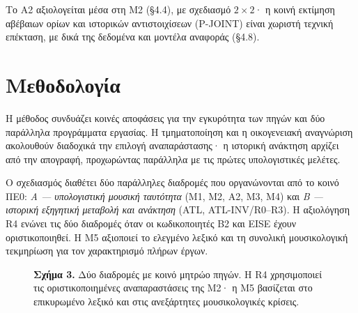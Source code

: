\documentclass[11pt,a4paper]{article}
\newcommand{\figcap}[2]{\par\vspace{3pt}\begin{minipage}{0.95\linewidth}\footnotesize\textbf{#1} #2\end{minipage}\par}
\begin{document}
\noindent Το Α2 αξιολογείται μέσα στη Μ2 (§4.4), με σχεδιασμό $2\times2$· η κοινή εκτίμηση αβέβαιων ορίων και ιστορικών αντιστοιχίσεων (P-JOINT) είναι χωριστή τεχνική επέκταση, με δικά της δεδομένα και μοντέλα αναφοράς (§4.8).


\section{Μεθοδολογία}\label{ux3bcux3b5ux3b8ux3bfux3b4ux3bfux3bbux3bfux3b3ux3afux3b1}

Η μέθοδος συνδυάζει κοινές αποφάσεις για την εγκυρότητα των πηγών και δύο παράλληλα προγράμματα εργασίας. Η τμηματοποίηση και η οικογενειακή αναγνώριση ακολουθούν διαδοχικά την επιλογή αναπαράστασης· η ιστορική ανάκτηση αρχίζει από την απογραφή, προχωρώντας παράλληλα με τις πρώτες υπολογιστικές μελέτες.

Ο σχεδιασμός διαθέτει δύο παράλληλες διαδρομές που οργανώνονται από το κοινό ΠΕ0: \emph{Α — υπολογιστική μουσική ταυτότητα} (Μ1, Μ2, Α2, Μ3, Μ4) και \emph{Β — ιστορική εξηγητική μεταβολή και ανάκτηση} (ATL, ATL-INV/R0--R3). Η αξιολόγηση R4 ενώνει τις δύο διαδρομές όταν οι κωδικοποιητές B2 και EISE έχουν οριστικοποιηθεί. Η Μ5 αξιοποιεί το ελεγμένο λεξικό και τη συνολική μουσικολογική τεκμηρίωση για τον χαρακτηρισμό πλήρων έργων.


\begin{figure}[htbp]
\centering
{}
\figcap{Σχήμα 3.}{Δύο διαδρομές με κοινό μητρώο πηγών. Η R4 χρησιμοποιεί τις οριστικοποιημένες αναπαραστάσεις της M2· η M5 βασίζεται στο επικυρωμένο λεξικό και στις ανεξάρτητες μουσικολογικές κρίσεις.}
\end{figure}
\end{document}

